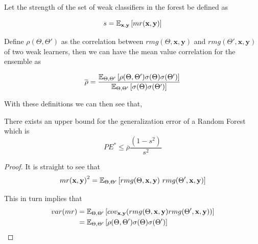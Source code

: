 \begin{appendices}
Let the strength of the set of weak classifiers in the forest be defined as

\begin{equation}\label{eq:rf-strength}
s = \operatorname{\mathbb{E}}_{\textbf{x},\textbf{y}} \left[ mr(\textbf{x},\textbf{y} ) \right]
\end{equation}

Define $ \rho(\Theta, \Theta')$ as the correlation between $rmg(\Theta,\textbf{x},\textbf{y})$ and $rmg(\Theta',\textbf{x},\textbf{y})$ of two weak learners, then we can have the mean value correlation for the ensemble as

\begin{equation}\label{eq:rf-meanCorrelation}
\overline{\rho} = \frac{\operatorname{\mathbb{E}}_{\Theta, \Theta'} \left[ \rho(\Theta, \Theta') \sigma(\Theta) \sigma(\Theta')\right]}
{\operatorname{\mathbb{E}}_{\Theta, \Theta'} \left[ \sigma(\Theta) \sigma(\Theta')\right]}
\end{equation}

With these definitions we can then see that,

\begin{theorem}
	There exists an upper bound for the generalization error of a Random Forest which is    \begin{equation}\label{eq:rf-PEBound}
	PE^* \leq \overline{\rho}\frac{(1-s^2)}{s^2}
	\end{equation}
\end{theorem}


\begin{proof}


	It is straight to see that
	\begin{equation}
	{mr( \textbf{x},\textbf{y} )}^2 = \Expect_{\Theta, \Theta'} \left[ rmg( \Theta,\textbf{x},\textbf{y} ) \ rmg(\Theta',\textbf{x},\textbf{y} ) \right]
	\end{equation}


	This in turn implies that
	\begin{equation}\label{eq:rf-marginFunVar}
	\begin{split}
	var(mr) & = \operatorname{\mathbb{E}}_{\Theta, \Theta'}
	\left[
	cov_{\textbf{x},\textbf{y}}
	(rmg(\Theta,\textbf{x},\textbf{y} )rmg(\Theta',\textbf{x},\textbf{y} ))
	\right] \\
	& = \operatorname{\mathbb{E}}_{\Theta, \Theta'}
	\left[
	\rho(\Theta, \Theta')\sigma(\Theta)\sigma(\Theta')
	\right]
	\end{split}
	\end{equation}


\end{proof}
\end{appendices}
